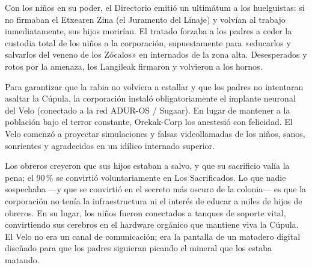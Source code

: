  Con los niños en su poder, el Directorio emitió un ultimátum a los huelguistas: si no firmaban el Etxearen Zina (el Juramento del Linaje) y volvían al trabajo inmediatamente, sus hijos morirían. El tratado forzaba a los padres a ceder la custodia total de los niños a la corporación, supuestamente para «educarlos y salvarlos del veneno de los Zócalos» en internados de la zona alta. Desesperados y rotos por la amenaza, los Langileak firmaron y volvieron a los hornos.

 Para garantizar que la rabia no volviera a estallar y que los padres no intentaran asaltar la Cúpula, la corporación instaló obligatoriamente el implante neuronal del Velo (conectado a la red ADUR-OS / Sugaar). En lugar de mantener a la población bajo el terror constante, Orekak-Corp los anestesió con felicidad. El Velo comenzó a proyectar simulaciones y falsas videollamadas de los niños, sanos, sonrientes y agradecidos en un idílico internado superior.

 Los obreros creyeron que sus hijos estaban a salvo, y que su sacrificio valía la pena; el 90\,\% se convirtió voluntariamente en Los Sacrificados. Lo que nadie sospechaba ---y que se convirtió en el secreto más oscuro de la colonia--- es que la corporación no tenía la infraestructura ni el interés de educar a miles de hijos de obreros. En su lugar, los niños fueron conectados a tanques de soporte vital, convirtiendo sus cerebros en el hardware orgánico que mantiene viva la Cúpula. El Velo no era un canal de comunicación; era la pantalla de un matadero digital diseñado para que los padres siguieran picando el mineral que los estaba matando.
